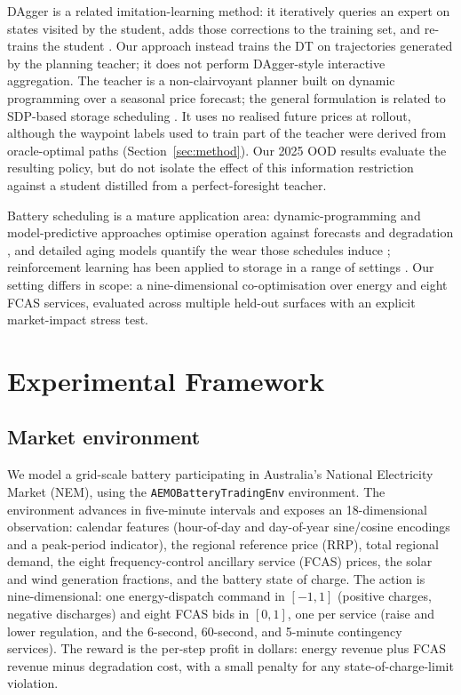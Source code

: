 \documentclass{article}
\begin{document}
DAgger is a related imitation-learning method: it iteratively queries an expert
on states visited by the student, adds those corrections to the training set, and
re-trains the student \citep{ross2011reduction}. Our approach instead trains the
DT on trajectories generated by the planning teacher; it does not perform
DAgger-style interactive aggregation. The teacher is a non-clairvoyant planner
built on dynamic programming over a seasonal price forecast; the general
formulation is related to SDP-based storage scheduling \citep{abdulla2016optimal}.
It uses no realised future prices at rollout, although the waypoint labels used
to train part of the teacher were derived from oracle-optimal paths
(Section~\ref{sec:method}).
Our 2025 OOD results evaluate the resulting policy, but do not isolate the
effect of this information restriction against a student distilled from a
perfect-foresight teacher.

Battery scheduling is a mature application area: dynamic-programming and
model-predictive approaches optimise operation against forecasts and
degradation \citep{abdulla2016optimal}, and detailed aging models quantify the
wear those schedules induce \citep{muenzel2015multifactor,kampker2025modelling};
reinforcement learning has been applied to storage in a range of settings
\citep{subramanya2022review}. Our setting differs in scope: a nine-dimensional
co-optimisation over energy and eight FCAS services, evaluated across multiple
held-out surfaces with an explicit market-impact stress test.

\section{Experimental Framework}
\label{sec:setup}

\subsection{Market environment}

We model a grid-scale battery participating in Australia's National Electricity
Market (NEM), using the \texttt{AEMOBatteryTradingEnv} environment. The
environment advances in five-minute intervals and exposes an 18-dimensional
observation: calendar features (hour-of-day and day-of-year sine/cosine
encodings and a peak-period indicator), the regional reference price (RRP),
total regional demand, the eight frequency-control ancillary service (FCAS)
prices, the solar and wind generation
fractions, and the battery state of charge. The action is nine-dimensional: one
energy-dispatch command in $[-1,1]$ (positive charges, negative discharges) and
eight FCAS bids in $[0,1]$, one per service (raise and lower regulation, and the
6-second, 60-second, and 5-minute contingency services). The reward is the
per-step profit in dollars: energy revenue plus FCAS revenue minus degradation
cost, with a small penalty for any state-of-charge-limit violation.
\end{document}
